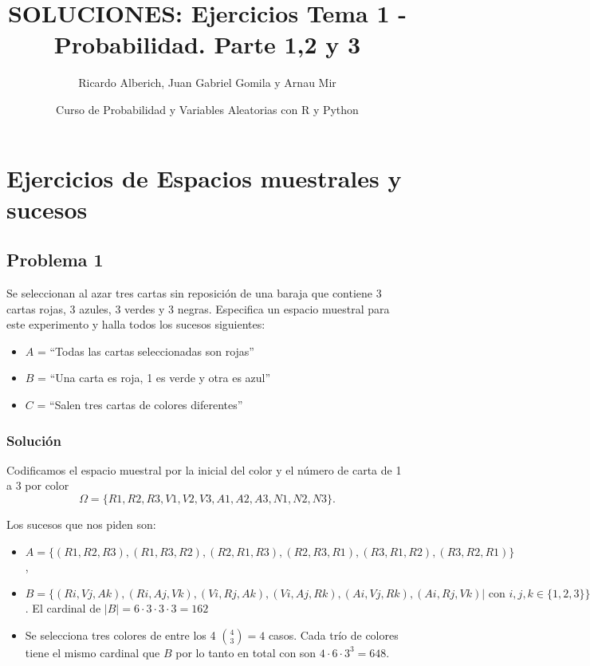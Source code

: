 \documentclass[
]{article}
\title{SOLUCIONES: Ejercicios Tema 1 - Probabilidad. Parte 1,2 y 3}
\author{Ricardo Alberich, Juan Gabriel Gomila y Arnau Mir}
\date{Curso de Probabilidad y Variables Aleatorias con R y Python}
\providecommand{\tightlist}{%
  \setlength{\itemsep}{0pt}\setlength{\parskip}{0pt}}
\begin{document}
\maketitle

{
\hypersetup{linkcolor=blue}
\setcounter{tocdepth}{2}
\tableofcontents
}
\hypertarget{ejercicios-de-espacios-muestrales-y-sucesos}{%
\section{Ejercicios de Espacios muestrales y
sucesos}\label{ejercicios-de-espacios-muestrales-y-sucesos}}

\hypertarget{problema-1}{%
\subsection{Problema 1}\label{problema-1}}

Se seleccionan al azar tres cartas sin reposición de una baraja que
contiene 3 cartas rojas, 3 azules, 3 verdes y 3 negras. Especifica un
espacio muestral para este experimento y halla todos los sucesos
siguientes:

\begin{itemize}
\tightlist
\item
  \(A\) = ``Todas las cartas seleccionadas son rojas''
\item
  \(B\) = ``Una carta es roja, 1 es verde y otra es azul''
\item
  \(C\) = ``Salen tres cartas de colores diferentes''
\end{itemize}

\hypertarget{soluciuxf3n}{%
\subsubsection{Solución}\label{soluciuxf3n}}

Codificamos el espacio muestral por la inicial del color y el número de
carta de 1 a 3 por color
\[\Omega=\{R1, R2, R3, V1, V2, V3, A1, A2, A3, N1, N2, N3 \}.\]

Los sucesos que nos piden son:

\begin{itemize}
\tightlist
\item
  \(A=\{(R1, R2, R3),(R1, R3, R2),(R2, R1, R3),(R2, R3, R1),(R3, R1, R2), (R3, R2, R1)\}\),
\item
  \(B=\{(Ri,Vj,Ak),(Ri,Aj,Vk),(Vi,Rj,Ak),(Vi,Aj,Rk),(Ai,Vj,Rk),(Ai,Rj,Vk) | \mbox{ con } i,j,k\in\{1,2,3\}\}\).
  El cardinal de \(\left|B\right|=6\cdot 3\cdot 3\cdot 3= 162\)
\item
  Se selecciona tres colores de entre los 4 \({{4}\choose {3}}=4\)
  casos. Cada trío de colores tiene el mismo cardinal que \(B\) por lo
  tanto en total con son \(4\cdot 6\cdot 3^3=648\).
\end{itemize}
\end{document}
